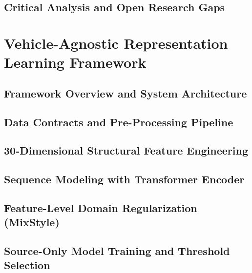 \documentclass[12pt, a4paper, reqno, oneside]{book}
\begin{document}
\section{Critical Analysis and Open Research Gaps}
\label{sec:rw_gaps}

\chapter{Vehicle-Agnostic Representation Learning Framework}
\label{chap:framework}

\section{Framework Overview and System Architecture}
\label{sec:fw_overview}

\section{Data Contracts and Pre-Processing Pipeline}
\label{sec:fw_preprocessing}

\section{30-Dimensional Structural Feature Engineering}
\label{sec:fw_features}

\section{Sequence Modeling with Transformer Encoder}
\label{sec:fw_transformer}

\section{Feature-Level Domain Regularization (MixStyle)}
\label{sec:fw_mixstyle}

\section{Source-Only Model Training and Threshold Selection}
\label{sec:fw_training}
\end{document}
